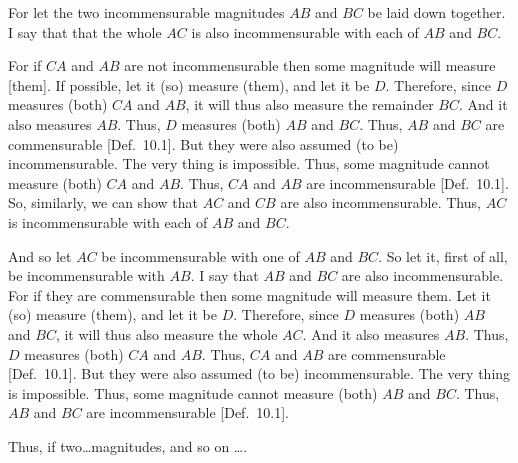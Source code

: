 \begin{Parallel}{}{}
{\epsfysize=0.6in
\centerline{}

For let the two incommensurable magnitudes $AB$ and $BC$ be
laid down together. I say that that the whole $AC$ is also
incommensurable with each of $AB$ and $BC$.

For if $CA$ and $AB$ are not incommensurable then some magnitude
will measure [them]. If possible, let it (so) measure (them), and let it
be $D$. Therefore, since $D$ measures (both) $CA$ and $AB$, it will
thus also measure the remainder $BC$. And it also measures $AB$.
Thus, $D$ measures (both) $AB$ and $BC$. Thus, $AB$ and $BC$ are
commensurable [Def.~10.1]. But they were also assumed (to be) incommensurable.
The very thing is impossible. Thus, some magnitude cannot
measure (both) $CA$ and $AB$. Thus, $CA$ and $AB$ are incommensurable [Def.~10.1]. So, similarly, we can show that $AC$ and
$CB$ are also incommensurable. Thus, $AC$ is incommensurable with each
of $AB$ and $BC$.

And so let $AC$ be incommensurable with one of $AB$ and $BC$. So
let it, first of all, be incommensurable with $AB$. I say that $AB$ and
$BC$ are also incommensurable. For if they are commensurable then
some magnitude will measure them. Let it (so) measure (them), and let it
be $D$. Therefore, since $D$ measures (both) $AB$ and $BC$, 
it will thus also measure the whole  $AC$. And it also measures $AB$. 
Thus, $D$ measures (both) $CA$ and $AB$. Thus, $CA$ and $AB$
are commensurable  [Def.~10.1]. But they
were also assumed (to be) incommensurable. The very thing is
impossible. Thus, some magnitude cannot measure (both) $AB$ and
$BC$. Thus, $AB$ and $BC$ are incommensurable  [Def.~10.1].

Thus, if two\ldots magnitudes, and so on \ldots.}
\end{Parallel}

